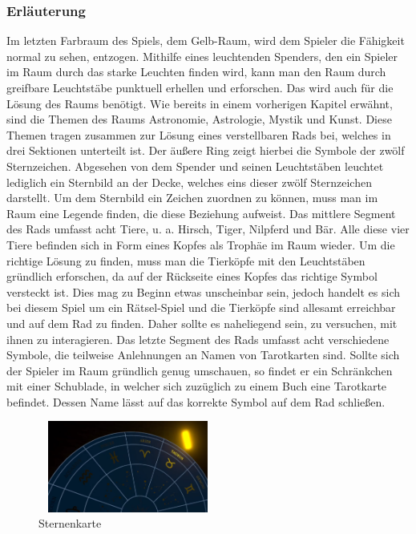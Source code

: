 \subsubsection{Erläuterung}
Im letzten Farbraum des Spiels, dem Gelb-Raum, wird dem Spieler die Fähigkeit normal zu sehen, entzogen. Mithilfe eines leuchtenden Spenders, den ein Spieler im Raum durch das starke Leuchten finden wird, kann man den Raum durch greifbare Leuchtstäbe punktuell erhellen und erforschen. Das wird auch für die Lösung des Raums benötigt. Wie bereits in einem vorherigen Kapitel erwähnt, sind die Themen des Raums Astronomie, Astrologie, Mystik und Kunst. Diese Themen tragen zusammen zur Lösung eines verstellbaren Rads bei, welches in drei Sektionen unterteilt ist. Der äußere Ring zeigt hierbei die Symbole der zwölf Sternzeichen. Abgesehen von dem Spender und seinen Leuchtstäben leuchtet lediglich ein Sternbild an der Decke, welches eins dieser zwölf Sternzeichen darstellt. Um dem Sternbild ein Zeichen zuordnen zu können, muss man im Raum eine Legende finden, die diese Beziehung aufweist. Das mittlere Segment des Rads umfasst acht Tiere, u. a. Hirsch, Tiger, Nilpferd und Bär. Alle diese vier Tiere befinden sich in Form eines Kopfes als Trophäe im Raum wieder. Um die richtige Lösung zu finden, muss man die Tierköpfe mit den Leuchtstäben gründlich erforschen, da auf der Rückseite eines Kopfes das richtige Symbol versteckt ist. Dies mag zu Beginn etwas unscheinbar sein, jedoch handelt es sich bei diesem Spiel um ein Rätsel-Spiel und die Tierköpfe sind allesamt erreichbar und auf dem Rad zu finden. Daher sollte es naheliegend sein, zu versuchen, mit ihnen zu interagieren. Das letzte Segment des Rads umfasst acht verschiedene Symbole, die teilweise Anlehnungen an Namen von Tarotkarten sind. Sollte sich der Spieler im Raum gründlich genug umschauen, so findet er ein Schränkchen mit einer Schublade, in welcher sich zuzüglich zu einem Buch eine Tarotkarte befindet. Dessen Name lässt auf das korrekte Symbol auf dem Rad schließen.
\begin{figure}
	\vspace*{-1cm}
	\includegraphics[width=5.9cm, height=3cm]{Pictures/Gelb-Raum_Sternenkarte}
	\caption{Sternenkarte}
	\vspace*{-1cm}
	\label{fig:Gelb-Raum_sternenkarte}
\end{figure}
